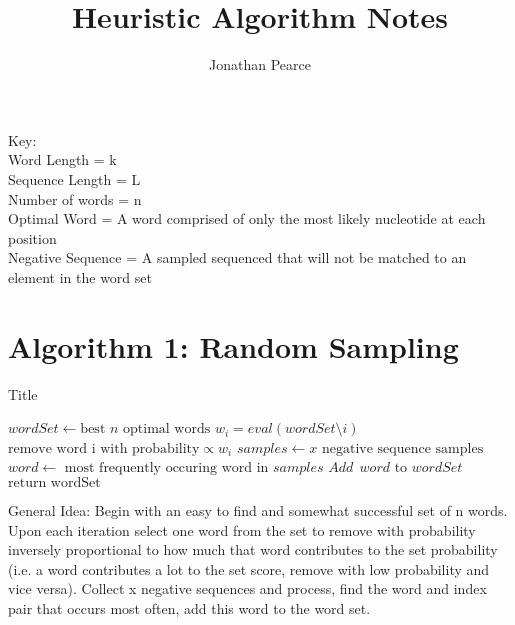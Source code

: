\documentclass[12pt]{article}
\begin{document}
 
 
\title{Heuristic Algorithm Notes}
\author{Jonathan Pearce}
\maketitle
$ $ \\
Key: \\
Word Length = k \\
Sequence Length = L \\
Number of words = n \\
Optimal Word = A word comprised of only the most likely nucleotide at each position \\
Negative Sequence = A sampled sequenced that will not be matched to an element in the word set

\section{Algorithm 1: Random Sampling}

\begin{algorithm}
\caption{Title}\label{euclid}
\begin{algorithmic}[1]
\State $wordSet \leftarrow \text{best } n \text{ optimal words}$
\State $w_i = eval(wordSet \setminus i)$
\EndFor
\State $\text{remove word i with probability} \propto w_i$
\State $samples \leftarrow x \text{ negative sequence samples}$
\State $word \leftarrow \text{ most frequently occuring word in } samples$
\State $Add \:\: word \text{ to } wordSet$
\EndWhile
\State $\text{return wordSet}$
\end{algorithmic}
\end{algorithm}

General Idea: Begin with an easy to find and somewhat successful set of n words. Upon each iteration select one word from the set to remove with probability inversely proportional to how much that word contributes to the set probability (i.e. a word contributes a lot to the set score, remove with low probability and vice versa). Collect x negative sequences and process, find the word and index pair that occurs most often, add this word to the word set.    


\pagebreak
\end{document}
